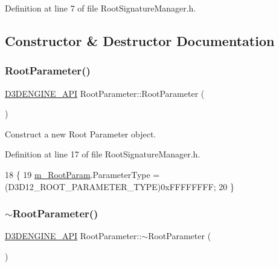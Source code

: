 Definition at line 7 of file Root\+Signature\+Manager.\+h.



\subsection{Constructor \& Destructor Documentation}
\mbox{\label{class_root_parameter_ab1b513666b2c4c57e10423e8502e356f}} 
\subsubsection{\texorpdfstring{Root\+Parameter()}{RootParameter()}}
{\footnotesize\ttfamily \mbox{\hyperlink{stdafx_8h_a8ee2d990c5dfba7794dd2b60741d7722}{D3\+D\+E\+N\+G\+I\+N\+E\+\_\+\+A\+PI}} Root\+Parameter\+::\+Root\+Parameter (\begin{DoxyParamCaption}{ }\end{DoxyParamCaption})\hspace{0.3cm}{\ttfamily [inline]}}



Construct a new Root Parameter object. 



Definition at line 17 of file Root\+Signature\+Manager.\+h.


\begin{DoxyCode}
18     \{
19         \mbox{\hyperlink{class_root_parameter_a66f26d4bb3cd092c625bc083c508fe40}{m\_RootParam}}.ParameterType = (D3D12\_ROOT\_PARAMETER\_TYPE)0xFFFFFFFF;
20     \}
\end{DoxyCode}
\mbox{\label{class_root_parameter_aa1d98ffad71c07f54e4a03538b2bc9c9}} 
\subsubsection{\texorpdfstring{$\sim$\+Root\+Parameter()}{~RootParameter()}}
{\footnotesize\ttfamily \mbox{\hyperlink{stdafx_8h_a8ee2d990c5dfba7794dd2b60741d7722}{D3\+D\+E\+N\+G\+I\+N\+E\+\_\+\+A\+PI}} Root\+Parameter\+::$\sim$\+Root\+Parameter (\begin{DoxyParamCaption}{ }\end{DoxyParamCaption})\hspace{0.3cm}{\ttfamily [inline]}}



